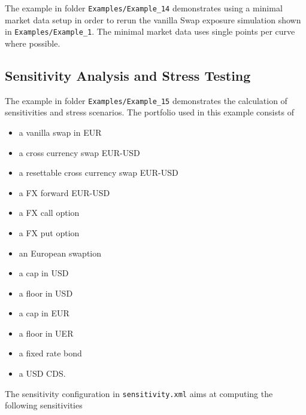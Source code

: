 \documentclass[12pt, a4paper]{article}
\begin{document}
The example in folder {\tt Examples/Example\_14} demonstrates using a minimal market data setup in order to rerun the vanilla Swap exposure simulation shown in {\tt Examples/Example\_1}. The minimal market data uses single points per curve where possible.

\subsection{Sensitivity Analysis and Stress Testing}\label{ex:sensitivity_stress}

The example in folder {\tt Examples/Example\_15} demonstrates the calculation of sensitivities and stress scenarios. The
portfolio used in this example consists of

\begin{itemize}
\item a vanilla swap in EUR
\item a cross currency swap EUR-USD
\item a resettable cross currency swap EUR-USD
\item a FX forward EUR-USD
\item a FX call option
\item a FX put option
\item an European swaption
\item a cap in USD
\item a floor in USD
\item a cap in EUR
\item a floor in UER
\item a fixed rate bond
\item a USD CDS.
\end{itemize}

The sensitivity configuration in {\tt sensitivity.xml} aims at computing the following sensitivities
\end{document}
